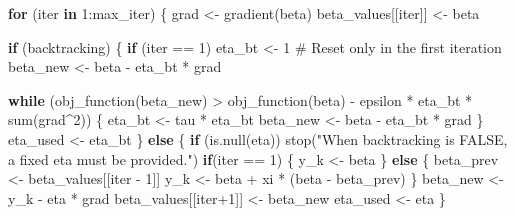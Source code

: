 \documentclass[
  letterpaper,
  DIV=11,
  numbers=noendperiod]{scrartcl}
\newenvironment{Shaded}{\begin{snugshade}}{\end{snugshade}}
\newcommand{\CommentTok}[1]{\textcolor[rgb]{0.37,0.37,0.37}{#1}}
\newcommand{\ControlFlowTok}[1]{\textcolor[rgb]{0.00,0.23,0.31}{\textbf{#1}}}
\newcommand{\DecValTok}[1]{\textcolor[rgb]{0.68,0.00,0.00}{#1}}
\newcommand{\FunctionTok}[1]{\textcolor[rgb]{0.28,0.35,0.67}{#1}}
\newcommand{\NormalTok}[1]{\textcolor[rgb]{0.00,0.23,0.31}{#1}}
\newcommand{\OtherTok}[1]{\textcolor[rgb]{0.00,0.23,0.31}{#1}}
\newcommand{\SpecialCharTok}[1]{\textcolor[rgb]{0.37,0.37,0.37}{#1}}
\newcommand{\StringTok}[1]{\textcolor[rgb]{0.13,0.47,0.30}{#1}}
\begin{document}
\begin{Shaded}
\begin{Highlighting}[]
  
  \ControlFlowTok{for}\NormalTok{ (iter }\ControlFlowTok{in} \DecValTok{1}\SpecialCharTok{:}\NormalTok{max\_iter) \{}
\NormalTok{    grad }\OtherTok{\textless{}{-}} \FunctionTok{gradient}\NormalTok{(beta)}
\NormalTok{    beta\_values[[iter]] }\OtherTok{\textless{}{-}}\NormalTok{ beta}
    
    \ControlFlowTok{if}\NormalTok{ (backtracking) \{}
      \ControlFlowTok{if}\NormalTok{ (iter }\SpecialCharTok{==} \DecValTok{1}\NormalTok{) eta\_bt }\OtherTok{\textless{}{-}} \DecValTok{1}  \CommentTok{\# Reset only in the first iteration}
\NormalTok{      beta\_new }\OtherTok{\textless{}{-}}\NormalTok{ beta }\SpecialCharTok{{-}}\NormalTok{ eta\_bt }\SpecialCharTok{*}\NormalTok{ grad}
      
      \ControlFlowTok{while}\NormalTok{ (}\FunctionTok{obj\_function}\NormalTok{(beta\_new) }\SpecialCharTok{\textgreater{}} \FunctionTok{obj\_function}\NormalTok{(beta) }\SpecialCharTok{{-}}\NormalTok{ epsilon }\SpecialCharTok{*}\NormalTok{ eta\_bt }\SpecialCharTok{*} \FunctionTok{sum}\NormalTok{(grad}\SpecialCharTok{\^{}}\DecValTok{2}\NormalTok{)) \{}
\NormalTok{        eta\_bt }\OtherTok{\textless{}{-}}\NormalTok{ tau }\SpecialCharTok{*}\NormalTok{ eta\_bt}
\NormalTok{        beta\_new }\OtherTok{\textless{}{-}}\NormalTok{ beta }\SpecialCharTok{{-}}\NormalTok{ eta\_bt }\SpecialCharTok{*}\NormalTok{ grad}
\NormalTok{      \}}
\NormalTok{      eta\_used }\OtherTok{\textless{}{-}}\NormalTok{ eta\_bt}
\NormalTok{    \} }\ControlFlowTok{else}\NormalTok{ \{}
      \ControlFlowTok{if}\NormalTok{ (}\FunctionTok{is.null}\NormalTok{(eta)) }\FunctionTok{stop}\NormalTok{(}\StringTok{"When backtracking is FALSE, a fixed eta must be provided."}\NormalTok{)}
      \ControlFlowTok{if}\NormalTok{(iter }\SpecialCharTok{==} \DecValTok{1}\NormalTok{) \{}
\NormalTok{        y\_k }\OtherTok{\textless{}{-}}\NormalTok{ beta}
\NormalTok{      \} }\ControlFlowTok{else}\NormalTok{ \{}
\NormalTok{        beta\_prev }\OtherTok{\textless{}{-}}\NormalTok{ beta\_values[[iter }\SpecialCharTok{{-}} \DecValTok{1}\NormalTok{]]}
\NormalTok{        y\_k }\OtherTok{\textless{}{-}}\NormalTok{ beta }\SpecialCharTok{+}\NormalTok{ xi }\SpecialCharTok{*}\NormalTok{ (beta }\SpecialCharTok{{-}}\NormalTok{ beta\_prev)}
\NormalTok{      \}}
\NormalTok{      beta\_new }\OtherTok{\textless{}{-}}\NormalTok{ y\_k }\SpecialCharTok{{-}}\NormalTok{ eta }\SpecialCharTok{*}\NormalTok{ grad}
\NormalTok{      beta\_values[[iter}\SpecialCharTok{+}\DecValTok{1}\NormalTok{]] }\OtherTok{\textless{}{-}}\NormalTok{ beta\_new}
\NormalTok{      eta\_used }\OtherTok{\textless{}{-}}\NormalTok{ eta}
\NormalTok{    \}}
    

\end{Highlighting}
\end{Shaded}
\end{document}

